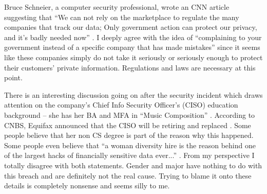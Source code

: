 \documentclass[12pt]{article}
\begin{document}
Bruce Schneier, a computer security professional, wrote an CNN article suggesting that ``We can not rely on the marketplace to regulate the many companies that track our data; Only government action can protect our privacy, and it's badly needed now'' \cite{CNN}. I deeply agree with the idea of ``complaining to your government instead of a specific company that has made mistakes'' since it seems like these companies simply do not take it seriously or seriously enough to protect their customers' private information. Regulations and laws are necessary at this point.  

There is an interesting discussion going on after the security incident which draws attention on the company's Chief Info Security Officer's (CISO) education background -- she has her BA and MFA in ``Music Composition'' \cite{CE}. According to CNBS, Equifax announced that the CISO will be retiring and replaced \cite{ES}. Some people believe that her non CS degree is part of the reason why this happened. Some people even believe that ``a woman diversity hire is the reason behind one of the largest hacks of financially sensitive data ever...'' \cite{AC}. From my perspective I totally disagree with both statements. Gender and major have nothing to do with this breach and are definitely not the real cause. Trying to blame it onto these details is completely nonsense and seems silly to me.    





\newpage


\end{document}
